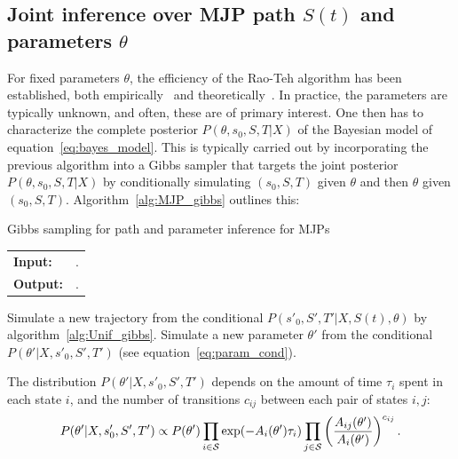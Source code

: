 \subsection{Joint inference over MJP path $S(t)$ and parameters $\theta$}
For fixed parameters $\theta$, the efficiency of the Rao-Teh algorithm has been established, both empirically~\citep{RaoTeh13} and theoretically~\citep{miasojedow2017}.
In practice, the parameters are typically unknown, and often, these are of primary interest. 
One then has to characterize the complete posterior $P(\theta, s_0, S, T|X)$ of the Bayesian model of equation~\eqref{eq:bayes_model}. 
This is typically carried out by incorporating the previous algorithm into a Gibbs sampler that targets the joint posterior $P(\theta, s_0, S, T|X)$ by conditionally simulating $(s_0, S, T)$ given $\theta$ and then $\theta$ given $(s_0, S, T)$. 
Algorithm~\ref{alg:MJP_gibbs} outlines this:
\begin{algorithm}[H]
  \caption{Gibbs sampling for path and parameter inference for MJPs}
   \label{alg:MJP_gibbs}
  \begin{tabular}{l l}
   \textbf{Input:  } %
                      & \text{The current MJP path $S(t) = (s_0, S, T)$, the current MJP parameters $\theta$}.\\ 
   \textbf{Output:  }& \text{New MJP trajectory $S' (t) = (s'_0, S', T')$ and 
                            parameters $\theta'$}.\\
   \hline
   \end{tabular}
   \begin{algorithmic}[1]
  \State  Simulate a new trajectory from the conditional 
  $P(s'_0, S', T'|X,S(t),\theta)$ by 
  algorithm~\ref{alg:Unif_gibbs}.
  \State Simulate a new parameter $\theta'$ from the conditional 
  $P(\theta'|X,s'_0,S',T')$ (see equation~\eqref{eq:param_cond}).
   \end{algorithmic}
\end{algorithm} 
\vspace{-.1in}
The distribution $P(\theta'|X,s'_0,S',T')$ depends on %
the amount of time $\tau_i$ spent in each state $i$, and the number of transitions $c_{ij}$ between each pair of states $i,j$: 
\begin{align}
  \label{eq:param_cond}
  P(\theta'|X,s'_0,S',T') \propto P(\theta') \prod_{i \in {\mathcal S}} \exp(-A_i(\theta')\tau_i) 
  \prod_{j \in {\mathcal S}} \left(\frac{A_{ij}(\theta')}{A_i(\theta')}\right)^{c_{ij}}.
\end{align}
